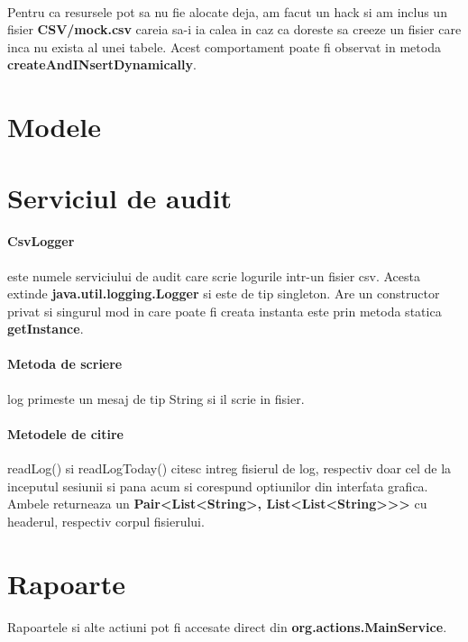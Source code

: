 \documentclass[oneside]{article}
\begin{document}
\paragraph{} Pentru ca resursele pot sa nu fie alocate deja, am facut un hack si am inclus un fisier \textbf{CSV/mock.csv} careia sa-i ia calea in caz ca doreste sa creeze un fisier care inca nu exista al unei tabele. Acest comportament poate fi observat in metoda \textbf{createAndINsertDynamically}.

\section[Modele]{Modele}

\section[Serviciul de audit]{Serviciul de audit}
\paragraph{CsvLogger} este numele serviciului de audit care scrie logurile intr-un fisier csv. Acesta extinde \textbf{java.util.logging.Logger} si este de tip singleton. Are un constructor privat si singurul mod in care poate fi creata instanta este prin metoda statica \textbf{getInstance}.

\paragraph{Metoda de scriere} log primeste un mesaj de tip String si il scrie in fisier.

\paragraph{Metodele de citire} readLog() si readLogToday() citesc intreg fisierul de log, respectiv doar cel de la inceputul sesiunii si pana acum si corespund optiunilor din interfata grafica. Ambele returneaza un \textbf{Pair<List<String>, List<List<String>{}>{}>} cu headerul, respectiv corpul fisierului.

\section[Rapoarte]{Rapoarte}
\paragraph{} Rapoartele si alte actiuni pot fi accesate direct din \textbf{org.actions.MainService}.
\end{document}
